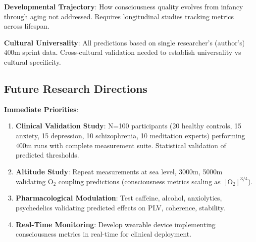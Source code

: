 \documentclass[11pt,onecolumn]{article}
\begin{document}
\textbf{Developmental Trajectory}: How consciousness quality evolves from infancy through aging not addressed. Requires longitudinal studies tracking metrics across lifespan.

\textbf{Cultural Universality}: All predictions based on single researcher's (author's) 400m sprint data. Cross-cultural validation needed to establish universality vs cultural specificity.

\subsection{Future Research Directions}

\textbf{Immediate Priorities}:
\begin{enumerate}
\item \textbf{Clinical Validation Study}: N=100 participants (20 healthy controls, 15 anxiety, 15 depression, 10 schizophrenia, 10 meditation experts) performing 400m runs with complete measurement suite. Statistical validation of predicted thresholds.

\item \textbf{Altitude Study}: Repeat measurements at sea level, 3000m, 5000m validating O$_2$ coupling predictions (consciousness metrics scaling as $[\text{O}_2]^{3/4}$).

\item \textbf{Pharmacological Modulation}: Test caffeine, alcohol, anxiolytics, psychedelics validating predicted effects on PLV, coherence, stability.

\item \textbf{Real-Time Monitoring}: Develop wearable device implementing consciousness metrics in real-time for clinical deployment.
\end{enumerate}
\end{document}
